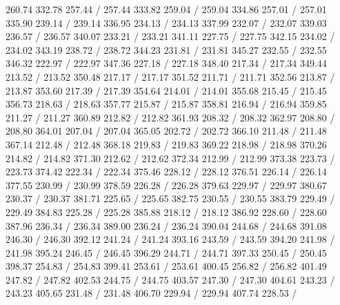{ 260.74 332.78 257.44 /
 257.44 333.82 259.04 /
 259.04 334.86 257.01 /
 257.01 335.90 239.14 /
 239.14 336.95 234.13 /
 234.13 337.99 232.07 /
 232.07 339.03 236.57 /
 236.57 340.07 233.21 /
 233.21 341.11 227.75 /
 227.75 342.15 234.02 /
 234.02 343.19 238.72 /
 238.72 344.23 231.81 /
 231.81 345.27 232.55 /
 232.55 346.32 222.97 /
 222.97 347.36 227.18 /
 227.18 348.40 217.34 /
 217.34 349.44 213.52 /
 213.52 350.48 217.17 /
 217.17 351.52 211.71 /
 211.71 352.56 213.87 /
 213.87 353.60 217.39 /
 217.39 354.64 214.01 /
 214.01 355.68 215.45 /
 215.45 356.73 218.63 /
 218.63 357.77 215.87 /
 215.87 358.81 216.94 /
 216.94 359.85 211.27 /
 211.27 360.89 212.82 /
 212.82 361.93 208.32 /
 208.32 362.97 208.80 /
 208.80 364.01 207.04 /
 207.04 365.05 202.72 /
 202.72 366.10 211.48 /
 211.48 367.14 212.48 /
 212.48 368.18 219.83 /
 219.83 369.22 218.98 /
 218.98 370.26 214.82 /
 214.82 371.30 212.62 /
 212.62 372.34 212.99 /
 212.99 373.38 223.73 /
 223.73 374.42 222.34 /
 222.34 375.46 228.12 /
 228.12 376.51 226.14 /
 226.14 377.55 230.99 /
 230.99 378.59 226.28 /
 226.28 379.63 229.97 /
 229.97 380.67 230.37 /
 230.37 381.71 225.65 /
 225.65 382.75 230.55 /
 230.55 383.79 229.49 /
 229.49 384.83 225.28 /
 225.28 385.88 218.12 /
 218.12 386.92 228.60 /
 228.60 387.96 236.34 /
 236.34 389.00 236.24 /
 236.24 390.04 244.68 /
 244.68 391.08 246.30 /
 246.30 392.12 241.24 /
 241.24 393.16 243.59 /
 243.59 394.20 241.98 /
 241.98 395.24 246.45 /
 246.45 396.29 244.71 /
 244.71 397.33 250.45 /
 250.45 398.37 254.83 /
 254.83 399.41 253.61 /
 253.61 400.45 256.82 /
 256.82 401.49 247.82 /
 247.82 402.53 244.75 /
 244.75 403.57 247.30 /
 247.30 404.61 243.23 /
 243.23 405.65 231.48 /
 231.48 406.70 229.94 /
 229.94 407.74 228.53 /
}
